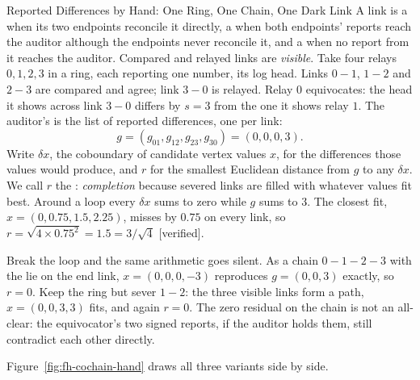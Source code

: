 \documentclass[11pt,a4paper]{article}
\theoremstyle{definition}
\theoremstyle{remark}
\begin{document}
%
\begin{pdexample}{Reported Differences by Hand: One Ring, One Chain, One Dark Link}
\setlength{\parskip}{4pt plus 1pt}
A link is a  when its two endpoints reconcile it
directly, a  when both endpoints' reports reach the
auditor although the endpoints never reconcile it, and a 
when no report from it reaches the auditor. Compared and relayed links are
\emph{visible}. Take four relays $0,1,2,3$ in a ring, each reporting one
number, its log head. Links $0\!-\!1$, $1\!-\!2$ and $2\!-\!3$ are compared and
agree; link $3\!-\!0$ is relayed. Relay $0$ equivocates: the head it shows across link
$3\!-\!0$ differs by $s=3$ from the one it shows relay $1$. The auditor's
 is the list of reported differences, one per link:
\[
g=(g_{01},g_{12},g_{23},g_{30})=(0,0,0,3).
\]
Write $\delta x$, the coboundary of candidate vertex values $x$, for the
differences those values would produce, and $r$ for the smallest Euclidean
distance from $g$ to any $\delta x$. We call $r$ the : \emph{completion} because severed links are filled with whatever
values fit best. Around a loop every $\delta x$ sums to zero while $g$ sums to
$3$. The closest fit, $x=(0,0.75,1.5,2.25)$, misses by $0.75$ on every link,
so $r=\sqrt{4\times0.75^{2}}=1.5=3/\sqrt4$ [verified].

Break the loop and the same arithmetic goes silent. As a chain
$0\!-\!1\!-\!2\!-\!3$ with the lie on the end link, $x=(0,0,0,-3)$ reproduces
$g=(0,0,3)$ exactly, so $r=0$. Keep the ring but sever $1\!-\!2$: the three
visible links form a path, $x=(0,0,3,3)$ fits, and again $r=0$. The zero
residual on the chain is not an all-clear: the equivocator's two signed
reports, if the auditor holds them, still contradict each other directly.
\end{pdexample}

Figure~\ref{fig:fh-cochain-hand} draws all three variants side by side.


\end{document}
